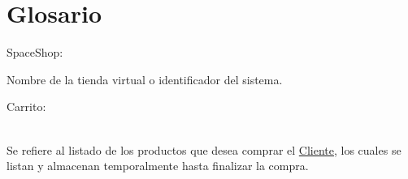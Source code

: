 \chapter{Glosario}

\hypertarget{SpaceShop}{SpaceShop:} Nombre de la tienda virtual o identificador del sistema.

\hypertarget{carrito}{Carrito:} \\
	Se refiere al listado de los productos que desea comprar el \hyperlink{Cliente}{Cliente}, los cuales se listan y almacenan temporalmente hasta finalizar la compra.